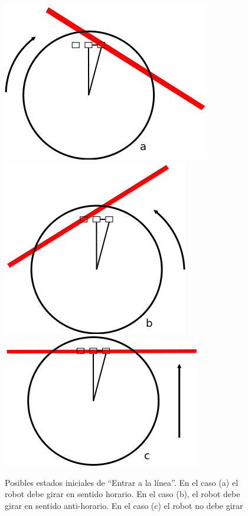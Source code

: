\begin{figure}[htp]
\begin{center}
\includegraphics[scale=0.4]{comportamientos/figures/floorSensorsLine.png}
\includegraphics[scale=0.4]{comportamientos/figures/floorSensorsLine1.png}
\includegraphics[scale=0.4]{comportamientos/figures/floorSensorsLine2.png}
\caption[Posibles estados iniciales de ``Entrar a la l\'inea'']{Posibles
		estados iniciales de ``Entrar a la l\'inea''. En el caso (a) el
		robot debe girar en sentido horario. En el caso (b), el robot debe
		girar en sentido anti-horario. En el caso (c) el robot no debe girar}
\label{fig:floorSensorsInitialStates}
\end{center}
\end{figure}

